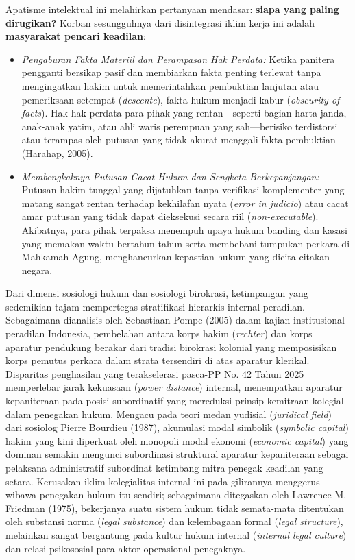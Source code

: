 \documentclass[12pt, a4paper]{article}
\begin{document}
Apatisme intelektual ini melahirkan pertanyaan mendasar: \textbf{siapa yang paling dirugikan?} Korban sesungguhnya dari disintegrasi iklim kerja ini adalah \textbf{masyarakat pencari keadilan}:
\begin{itemize}
    \item \textit{Pengaburan Fakta Materiil dan Perampasan Hak Perdata:} Ketika panitera pengganti bersikap pasif dan membiarkan fakta penting terlewat tanpa mengingatkan hakim untuk memerintahkan pembuktian lanjutan atau pemeriksaan setempat (\textit{descente}), fakta hukum menjadi kabur (\textit{obscurity of facts}). Hak-hak perdata para pihak yang rentan---seperti bagian harta janda, anak-anak yatim, atau ahli waris perempuan yang sah---berisiko terdistorsi atau terampas oleh putusan yang tidak akurat menggali fakta pembuktian (Harahap, 2005).
    \item \textit{Membengkaknya Putusan Cacat Hukum dan Sengketa Berkepanjangan:} Putusan hakim tunggal yang dijatuhkan tanpa verifikasi komplementer yang matang sangat rentan terhadap kekhilafan nyata (\textit{error in judicio}) atau cacat amar putusan yang tidak dapat dieksekusi secara riil (\textit{non-executable}). Akibatnya, para pihak terpaksa menempuh upaya hukum banding dan kasasi yang memakan waktu bertahun-tahun serta membebani tumpukan perkara di Mahkamah Agung, menghancurkan kepastian hukum yang dicita-citakan negara.
\end{itemize}

Dari dimensi sosiologi hukum dan sosiologi birokrasi, ketimpangan yang sedemikian tajam mempertegas stratifikasi hierarkis internal peradilan. Sebagaimana dianalisis oleh Sebastiaan Pompe (2005) dalam kajian institusional peradilan Indonesia, pembelahan antara korps hakim (\textit{rechter}) dan korps aparatur pendukung berakar dari tradisi birokrasi kolonial yang memposisikan korps pemutus perkara dalam strata tersendiri di atas aparatur klerikal. Disparitas penghasilan yang terakselerasi pasca-PP No. 42 Tahun 2025 memperlebar jarak kekuasaan (\textit{power distance}) internal, menempatkan aparatur kepaniteraan pada posisi subordinatif yang mereduksi prinsip kemitraan kolegial dalam penegakan hukum. Mengacu pada teori medan yudisial (\textit{juridical field}) dari sosiolog Pierre Bourdieu (1987), akumulasi modal simbolik (\textit{symbolic capital}) hakim yang kini diperkuat oleh monopoli modal ekonomi (\textit{economic capital}) yang dominan semakin mengunci subordinasi struktural aparatur kepaniteraan sebagai pelaksana administratif subordinat ketimbang mitra penegak keadilan yang setara. Kerusakan iklim kolegialitas internal ini pada gilirannya menggerus wibawa penegakan hukum itu sendiri; sebagaimana ditegaskan oleh Lawrence M. Friedman (1975), bekerjanya suatu sistem hukum tidak semata-mata ditentukan oleh substansi norma (\textit{legal substance}) dan kelembagaan formal (\textit{legal structure}), melainkan sangat bergantung pada kultur hukum internal (\textit{internal legal culture}) dan relasi psikososial para aktor operasional penegaknya.
\end{document}
